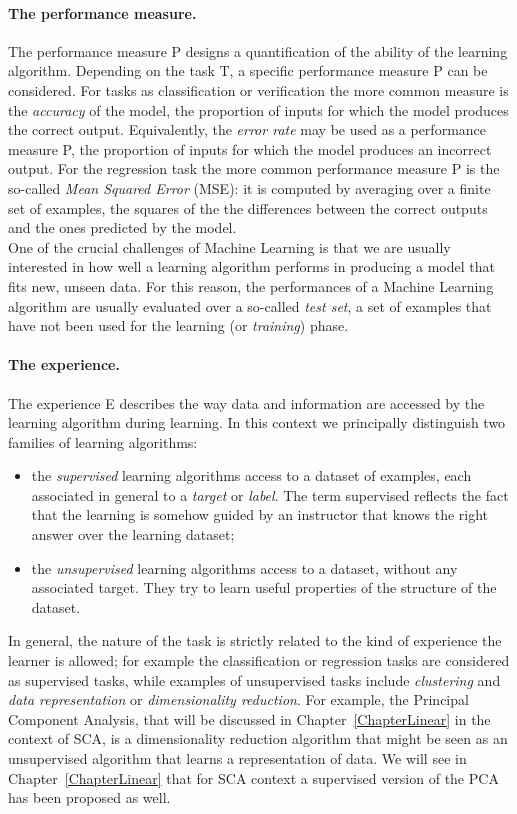 \paragraph*{The performance measure.} The performance measure P designs a quantification of the ability of the learning algorithm. Depending on the task T, a specific performance measure P can be considered. For tasks as classification or verification the more common measure is the \emph{accuracy} of the model, \ie the proportion of inputs for which the model produces the correct output. Equivalently, the \emph{error rate} may be used as a performance measure P, \ie the proportion of inputs for which the model produces an incorrect output. For the regression task the more common performance measure P is the so-called \emph{Mean Squared Error} (MSE): it is computed by averaging over a finite set of examples, the squares of the the differences between the correct outputs and the ones predicted by the model.\\
One of the crucial challenges of Machine Learning is that we are usually interested in how well a learning algorithm performs in producing a model that fits new, unseen data. For this reason, the performances of a Machine Learning algorithm are usually evaluated over a so-called \emph{test set}, \ie a set of examples that have not been used for the learning (or \emph{training}) phase. 

\paragraph*{The experience.} The experience E describes the way data and information are accessed by the learning algorithm during learning. In this context we principally distinguish two families of learning algorithms: 
\begin{itemize}
\item the \emph{supervised} learning algorithms access to a dataset of examples, each associated in general to a \emph{target} or \emph{label}. The term supervised reflects the fact that the learning is somehow guided by an instructor that knows the right answer over the learning dataset;
\item the \emph{unsupervised} learning algorithms access to a dataset, without any associated target. They try to learn useful properties of the structure of the dataset. 
\end{itemize}
In general, the nature of the task is strictly related to the kind of experience the learner is allowed; for example the classification or regression tasks are considered as supervised tasks, while examples of unsupervised tasks include \emph{clustering} and \emph{data representation} or \emph{dimensionality reduction}. For example, the Principal Component Analysis, that will be discussed in Chapter~\ref{ChapterLinear} in the context of SCA, is a dimensionality reduction algorithm that might be seen as an unsupervised algorithm that learns a representation of data. We will see in Chapter~\ref{ChapterLinear} that for SCA context a supervised version of the PCA has been proposed as well. 


